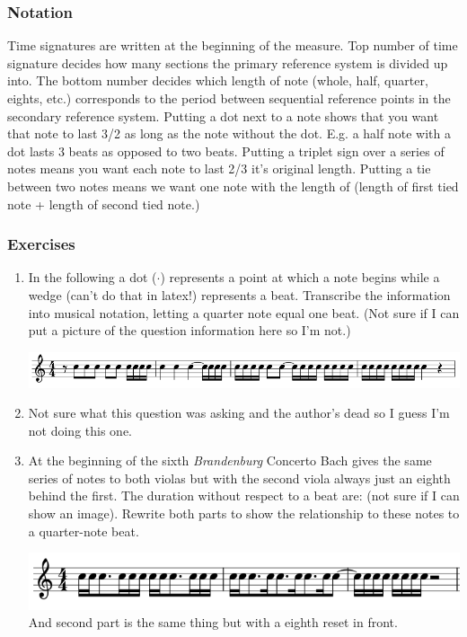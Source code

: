\documentclass{article}
\begin{document}
\subsubsection{Notation}
Time signatures are written at the beginning of the measure. Top number of time signature decides how many sections the primary reference system is divided up into. The bottom number decides which length of note (whole, half, quarter, eights, etc.) corresponds to the period between sequential reference points in the secondary reference system. Putting a dot next to a note shows that you want that note to last 3/2 as long as the note without the dot. E.g. a half note with a dot lasts 3 beats as opposed to two beats. Putting a triplet sign over a series of notes means you want each note to last 2/3 it's original length. Putting a tie between two notes means we want one note with the length of (length of first tied note + length of second tied note.)
\subsubsection{Exercises}
\begin{enumerate}
  \item In the following a dot ($\cdot$) represents a point at which a note begins while a wedge (can't do that in latex!) represents a beat. Transcribe the information into musical notation, letting a quarter note equal one beat. (Not sure if I can put a picture of the question information here so I'm not.) 

    \includegraphics[width=\linewidth]{ex221.png}
  \item Not sure what this question was asking and the author's dead so I guess I'm not doing this one.
  \item At the beginning of the sixth \textit{Brandenburg} Concerto Bach gives the same series of notes to both violas but with the second viola always just an eighth behind the first. The duration without respect to a beat are: (not sure if I can show an image). Rewrite both parts to show the relationship to these notes to a quarter-note beat.

    \includegraphics[width=\linewidth]{ex2231.png}\\
    And second part is the same thing but with a eighth reset in front.
\end{enumerate}
\end{document}
